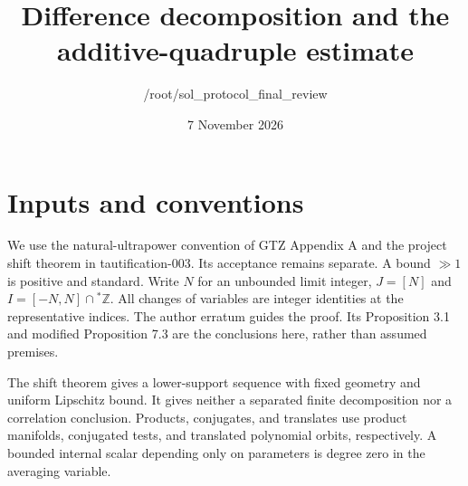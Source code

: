 \documentclass[11pt]{article}
\title{Difference decomposition and the additive-quadruple estimate}
\author{/root/sol\_protocol\_final\_review}
\date{7 November 2026}
\newcommand{\Z}{\mathbb Z}
\begin{document}
\maketitle

\section{Inputs and conventions}
We use the natural-ultrapower convention of GTZ Appendix A and the
project shift theorem in tautification-003. Its acceptance remains
separate. A bound $\gg1$ is positive and standard. Write $N$ for an
unbounded limit integer, $J=[N]$ and $I=[-N,N]\cap{}^*\Z$. All changes
of variables are integer identities at the representative indices.
The author erratum guides the proof. Its Proposition 3.1 and modified
Proposition 7.3 are the conclusions here, rather than assumed premises.

The shift theorem gives a lower-support sequence with fixed geometry
and uniform Lipschitz bound. It gives neither a separated finite
decomposition nor a correlation conclusion. Products, conjugates,
and translates use product manifolds, conjugated tests, and translated
polynomial orbits, respectively. A bounded internal scalar depending
only on parameters is degree zero in the averaging variable.
\end{document}
